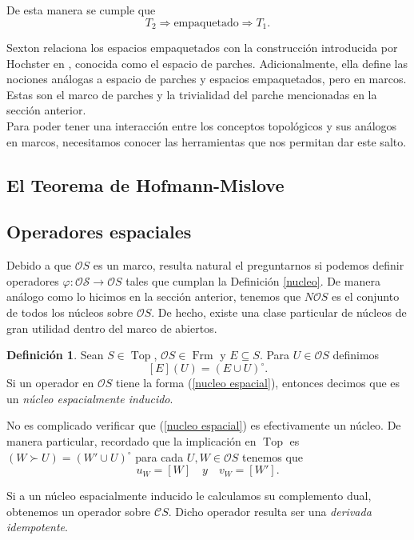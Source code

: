 \documentclass[11pt]{amsart}
\DeclareMathOperator{\Frm}{Frm}
\DeclareMathOperator{\Top}{Top}
\theoremstyle{plain}
\theoremstyle{definition}
\newtheorem{dfn}[thm]{Definición}
\begin{document}
De esta manera se cumple que
\[
T_2\Rightarrow \text{empaquetado}\Rightarrow T_1.
\]

Sexton relaciona los espacios empaquetados con la construcción introducida por Hochster en \cite{hochster1969prime}, conocida como el espacio de parches. Adicionalmente, 
ella define las nociones análogas a espacio de parches y espacios empaquetados, pero en marcos. Estas son el marco de parches y la trivialidad del parche mencionadas en la sección anterior.\\

Para poder tener una interacción entre los conceptos topológicos y sus análogos en marcos, necesitamos conocer las herramientas 
que nos permitan dar este salto.

\subsection{El Teorema de Hofmann-Mislove}

\subsection{Operadores espaciales}
Debido a que $\mathcal{O}S$ es un marco, resulta natural el preguntarnos si podemos definir operadores 
$\varphi\colon \mathcal{OS}\to \mathcal{O}S$ tales que cumplan la Definición \ref{nucleo}. De manera análogo como lo hicimos en la sección 
anterior, tenemos que $N\mathcal{O}S$ es el conjunto de todos los núcleos sobre $\mathcal{O}S$. De hecho, existe una clase particular de núcleos 
de gran utilidad dentro del marco de abiertos.
\begin{dfn}\label{Nespacial}
Sean $S\in \Top$, $\mathcal{O}S\in \Frm$ y $E\subseteq S$. Para $U\in \mathcal{O}S$ definimos
\begin{equation}\label{nucleo espacial}
[E](U)=(E\cup U)^\circ.
\end{equation}
Si un operador en $\mathcal{O}S$ tiene la forma (\ref{nucleo espacial}), entonces decimos que es un \emph{núcleo espacialmente inducido}.
\end{dfn}

No es complicado verificar que (\ref{nucleo espacial}) es efectivamente un núcleo. De manera particular, 
recordado que la implicación en $\Top$ es $(W\succ U)=(W'\cup U)^\circ$ para cada $U, W\in \mathcal{O}S$ tenemos que 
\[
u_W=[W]\quad y \quad v_W=[W'].
\] 

Si a un núcleo espacialmente inducido le calculamos su complemento dual, obtenemos un operador sobre $\mathcal{C}S$. Dicho operador resulta ser una \emph{derivada idempotente}.
\end{document}
